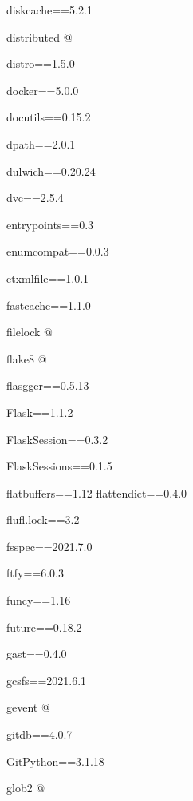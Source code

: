 \documentclass[letterpaper,10pt,english]{sphinxmanual}
\begin{document}
\sphinxAtStartPar
diskcache==5.2.1

\sphinxAtStartPar
distributed @ 

\sphinxAtStartPar
distro==1.5.0

\sphinxAtStartPar
docker==5.0.0

\sphinxAtStartPar
docutils==0.15.2

\sphinxAtStartPar
dpath==2.0.1

\sphinxAtStartPar
dulwich==0.20.24

\sphinxAtStartPar
dvc==2.5.4

\sphinxAtStartPar
entrypoints==0.3

\sphinxAtStartPar
enum\sphinxhyphen{}compat==0.0.3

\sphinxAtStartPar
et\sphinxhyphen{}xmlfile==1.0.1

\sphinxAtStartPar
fastcache==1.1.0

\sphinxAtStartPar
filelock @ 

\sphinxAtStartPar
flake8 @ 

\sphinxAtStartPar
flasgger==0.5.13

\sphinxAtStartPar
Flask==1.1.2

\sphinxAtStartPar
Flask\sphinxhyphen{}Session==0.3.2

\sphinxAtStartPar
Flask\sphinxhyphen{}Sessions==0.1.5

\sphinxAtStartPar
flatbuffers==1.12
flatten\sphinxhyphen{}dict==0.4.0

\sphinxAtStartPar
flufl.lock==3.2

\sphinxAtStartPar
fsspec==2021.7.0

\sphinxAtStartPar
ftfy==6.0.3

\sphinxAtStartPar
funcy==1.16

\sphinxAtStartPar
future==0.18.2

\sphinxAtStartPar
gast==0.4.0

\sphinxAtStartPar
gcsfs==2021.6.1

\sphinxAtStartPar
gevent @ 

\sphinxAtStartPar
gitdb==4.0.7

\sphinxAtStartPar
GitPython==3.1.18

\sphinxAtStartPar
glob2 @ 
\end{document}
